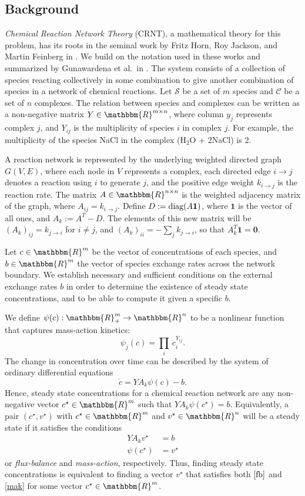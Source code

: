 \documentclass[smallextended]{svjour3}       %
\newcounter{sent}
\newcommand*{\diag}{\mbox{\rm diag}}
\newcommand*{\0}{\mathbf{0}}
\newcommand*{\1}{\mathbf{1}}
\newcommand*{\R}{\mathbbm{R}}
\begin{document}
\subsection{Background}
\label{background}

\textit{Chemical Reaction Network Theory} (CRNT), a mathematical theory for
this problem, has its roots in the seminal work by Fritz Horn, Roy Jackson, and
Martin Feinberg in \cite{GMAK,uniqueEPandLyapunov,necc-suff-CB,deficiency0,deficiency1}.
We build on the notation used in these works and summarized by
Gunawardena et al.\ in \cite{gunawardena}. The system consists of a collection
of species reacting collectively in some combination to give another
combination of species in a network of chemical reactions.  Let $\mathcal{S}$
be a set of $m$ species and $\mathcal{C}$ be a set of $n$ complexes. The
relation between species and complexes can be written as a non-negative matrix
$Y\in\R^{m\times n}$, where column $y_j$ represents complex $j$, and $Y_{i j}$
is the multiplicity of species $i$ in complex $j$.  For example, the
multiplicity of the species NaCl in the complex (H$_2$O + 2NaCl) is 2.  

A reaction network is represented by the underlying weighted directed graph
$G(V,E)$, where each node in $V$ represents a complex, each directed edge
$i\rightarrow j$ denotes a reaction using $i$ to generate $j$, and the
positive edge weight $k_{i\rightarrow j}$ is the reaction rate.  The matrix $A
\in \R^{n \times n}$ is the weighted adjacency matrix of the graph, where
$A_{ij}=k_{i\rightarrow j}$.  Define $D := \diag(A\1)$, where $\1$ is the
vector of all ones, and $A_k := A^T-D$.  The elements of this new matrix will
be $(A_k)_{ij} = k_{j \rightarrow i}$ for $i \neq j$, and $(A_k)_{ii} = -\sum_j
k_{j \rightarrow i}$, so that $A_k^T \1 = \0$.  

Let $c \in \R^m$ be the vector of concentrations of each species, and $b \in
\R^m$ the vector of species exchange rates across the network boundary. We
establish necessary and sufficient conditions on the external exchange rates
$b$ in order to determine the existence of steady state concentrations, and to
be able to compute it given a specific $b$.  

We define $\psi(c):\R^m_+\rightarrow \R^n$ to be a nonlinear function that
captures mass-action kinetics:
\[
\psi_j(c) = \prod_i\,c_i^{Y_{ij}}.
\] 
The change in concentration over time can be described by the system of
ordinary differential equations 
\[
\dot{c} = YA_k\psi(c) - b.
\] 
\noindent Hence, steady state concentrations for a chemical reaction network
are any non-negative vector $c^\star\in\R^m$ such that $YA_k\psi(c^\star)=b$.
Equivalently, a pair $(c^\star,v^\star)$ with $c^\star\in\R^m$ and
$v^\star\in\R^n$ will be a steady state if it satisfies the conditions
\begin{align} 
  YA_kv^\star &=b \label{fb}\tag{FB} \\ \psi(c^\star) &= v^\star
  \label{mak}\tag{MA} 
\end{align}
or \emph{flux-balance} and \emph{mass-action}, respectively. Thus, finding 
steady state concentrations is equivalent to finding a vector $v^\star$ that
satisfies both $\eqref{fb}$ and \eqref{mak} for some vector $c^\star\in\R^m$.
\end{document}
